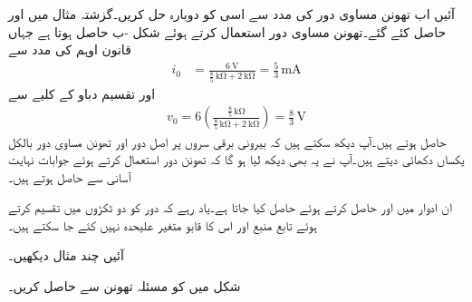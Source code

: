 آئیں اب تھونن مساوی دور کی مدد سے اسی کو دوبارہ حل کریں۔گزشتہ مثال میں  اور  حاصل کئے گئے۔تھونن مساوی دور استعمال کرتے ہوئے شکل -ب حاصل ہوتا ہے جہاں قانون اوہم کی مدد سے
\begin{align*}
i_0&=\frac{\SI{6}{\volt}}{\frac{8}{5} \, \si{\kilo\ohm}+\SI{2}{\kilo\ohm}}=\frac{5}{3}\,\si{\milli\ampere}
\end{align*}
اور تقسیم دباو کے کلیے سے
\begin{align*}
v_0=6\left(\frac{\frac{8}{5}\,\si{\kilo\ohm}}{\frac{8}{5}\,\si{\kilo\ohm}+\SI{2}{\kilo\ohm}}\right)=\frac{8}{3} \, \si{\volt}
\end{align*}
حاصل ہوتے ہیں۔آپ دیکھ سکتے ہیں کہ بیرونی برقی سروں پر اصل دور اور تھونن مساوی دور بالکل یکساں دکھائی دیتے ہیں۔آپ نے یہ بھی دیکھ لیا ہو گا کہ تھونن دور استعمال کرتے ہوئے جوابات نہایت آسانی سے حاصل ہوتے ہیں۔

ان ادوار میں  اور  حاصل کرتے ہوئے  حاصل کیا جاتا ہے۔یاد رہے کہ دور کو دو ٹکڑوں میں تقسیم کرتے ہوئے تابع منبع اور اس کا قابو متغیر علیحدہ نہیں کئے جا سکتے ہیں۔

آئیں چند مثال دیکھیں۔

شکل  میں  کو  مسئلہ تھونن سے حاصل کریں۔

